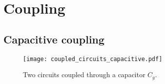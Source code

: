 



\section{Coupling}

\subsection{Capacitive coupling}

\begin{figure}
\begin{centering}
\texttt{[image: coupled\_circuits\_capacitive.pdf]}
\par\end{centering}
\caption{Two circuits coupled through a capacitor $C_g$.}
\label{Fig:coupledCircuits_capacitive}
\end{figure}

